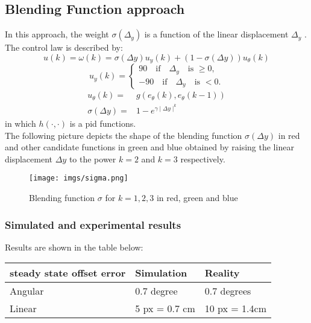 {\color{PineGreen}\subsection{Blending Function approach}\label{subsec:blend}}
In this approach, the weight $\sigma(\Delta_y)$ is a function of the linear displacement $\Delta_y$ .
The control law is described by:
\begin{equation}
    u(k) = \omega(k) = \sigma(\Delta y) u_{y}(k) +(1-\sigma(\Delta y)) u_{\theta}(k)
\end{equation}
\begin{equation}
  u_y(k)=\begin{cases}
    90 \quad \text{if} \quad \Delta_y  \quad \text{is $\geq 0$},\\
    -90 \quad \text{if} \quad \Delta_y  \quad \text{is $< 0$}.
  \end{cases}
\end{equation}
\begin{align}    
   	u_{\theta}(k) = & g(e_{\theta}(k),e_{\theta}(k-1))\\
   	\sigma(\Delta y) = & 1 - e^{\gamma \mid \Delta y \mid ^{k}}
\end{align}
in which $h(\cdot,\cdot)$ is a pid functions.\\
The following picture depicts the shape of the blending function $\sigma(\Delta y)$ in red and other candidate functions in green and blue obtained by raising the linear displacement $\Delta y$ to the power $k=2$ and $k=3$ respectively.
\begin{center}
	\begin{figure}[H]
	    \texttt{[image: imgs/sigma.png]}
 		\caption{Blending function $\sigma$ for $k=1,2,3$ in red, green and blue}
 		\label{fig:sigma}
	\end{figure}
\end{center}
{\color{PineGreen}\subsubsection{Simulated and experimental results}\label{subsubsec:blend_res}}
Results are shown in the table below:\\
\small
\noindent 
\begin{center}
    \begin{tabular}{ | p{5cm}| p{4cm} | p{4cm}|}
    \hline
    steady state offset error & Simulation & Reality \\ 
    \hline    
	Angular & 0.7 degree & 0.7 degrees	\\
    \hline    
	Linear & 5 px = 0.7 cm & 10 px = 1.4cm \\
    \hline    
    \end{tabular}
\end{center}
